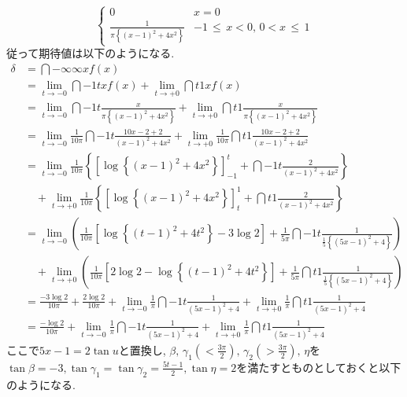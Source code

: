 \documentclass[dvipdfmx,titlepage, 11pt, a4paper]{jsarticle}%
\begin{document}
\begin{enumerate}[(1)]
\begin{equation*}
\begin{cases}
      0 & x = 0\\
      \frac{1}{\pi\left\{\left(x - 1\right)^2 + 4x^2\right\}} & -1\, \leq\, x < 0,\, 0 < x\, \leq\, 1 
    \end{cases}
  \end{equation*}
  従って期待値は以下のようになる.
  \begin{align*}
    \delta &= \dint{-\infty}{\infty}{xf(x)}\\
           &= \lim_{t \to -0}\dint{-1}{t}{xf(x)} + \lim_{t \to +0}\dint{t}{1}{xf(x)}\\
           &= \lim_{t \to -0}\dint{-1}{t}{\frac{x}{\pi\left\{(x - 1)^2 + 4x^2\right\}}}
             + \lim_{t \to +0}\dint{t}{1}{\frac{x}{\pi\left\{(x - 1)^2 + 4x^2\right\}}}\\
           &= \lim_{t \to -0}\frac{1}{10\pi}\dint{-1}{t}{\frac{10x - 2 + 2}{(x - 1)^2 + 4x^2}} 
             + \lim_{t \to +0}\frac{1}{10\pi}\dint{t}{1}{\frac{10x - 2 + 2}{(x - 1)^2 + 4x^2}}\\
           &= \lim_{t \to -0}\frac{1}{10\pi}\left\{\left[\log\left\{(x - 1)^2 + 4x^2\right\}\right]_{-1}^{t} + \dint{-1}{t}{\frac{2}{(x - 1)^2 + 4x^2}}\right\}\\
           &\quad + \lim_{t \to +0}\frac{1}{10\pi}\left\{\left[\log\left\{(x - 1)^2 + 4x^2\right\}\right]_{t}^{1} + \dint{t}{1}{\frac{2}{(x - 1)^2 + 4x^2}}\right\}\\
           &= \lim_{t \to -0}\left(\frac{1}{10\pi}\left[\log\left\{(t - 1)^2 + 4t^2\right\} - 3\log 2\right] + \frac{1}{5\pi}\dint{-1}{t}{\frac{1}{\frac{1}{5}\left\{(5x - 1)^2 + 4\right\}}}\right)\\
           &\quad + \lim_{t \to +0}\left(\frac{1}{10\pi}\left[2\log 2 - \log\left\{(t - 1)^2 + 4t^2\right\}\right] + \frac{1}{5\pi}\dint{t}{1}{\frac{1}{\frac{1}{5}\left\{(5x - 1)^2 + 4\right\}}}\right)\\
           &= \frac{-3\log 2}{10\pi} + \frac{2\log 2}{10\pi} + \lim_{t \to -0}\frac{1}{\pi}\dint{-1}{t}{\frac{1}{(5x - 1)^2 + 4}} + \lim_{t \to +0}\frac{1}{\pi}\dint{t}{1}{\frac{1}{(5x - 1)^2 + 4}}\\
           &= \frac{-\log 2}{10\pi} + \lim_{t \to -0}\frac{1}{\pi}\dint{-1}{t}{\frac{1}{(5x - 1)^2 + 4}} + \lim_{t \to +0}\frac{1}{\pi}\dint{t}{1}{\frac{1}{(5x - 1)^2 + 4}}
  \end{align*}
  ここで$5x - 1 = 2\tan u$と置換し, $\beta,\, \gamma_1(< \frac{3\pi}{2}),\, \gamma_2(> \frac{3\pi}{2}),\, \eta$を$\tan\beta = -3, \tan\gamma_1 = \tan\gamma_2 = \frac{5t - 1}{2}, \tan\eta = 2$を満たすとものとしておくと以下のようになる.

\end{enumerate}
\end{document}

